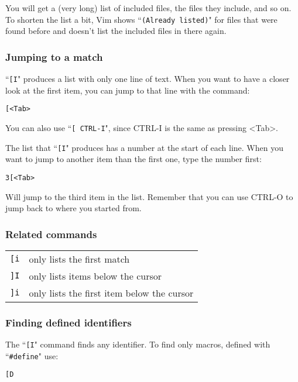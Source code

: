 You will get a (very long) list of included files, the files they include, and so on.
To shorten the list a bit, Vim shows ``\texttt{(Already listed)}" for files that were found before and doesn't list the included files in there again.

\subsubsection{Jumping to a match}
``\texttt{[I}" produces a list with only one line of text.
When you want to have a closer look at the first item, you can jump to that line with the command:

\begin{Verbatim}[samepage=true]
 [<Tab>
\end{Verbatim}

You can also use ``\texttt{[ CTRL-I}", since CTRL-I is the same as pressing <Tab>.

The list that ``\texttt{[I}" produces has a number at the start of each line.
When you want to jump to another item than the first one, type the number first:

\begin{Verbatim}[samepage=true]
 3[<Tab>
\end{Verbatim}

Will jump to the third item in the list.
Remember that you can use CTRL-O to jump back to where you started from.
\subsubsection{Related commands}

\begin{center} \begin{tabular}{c l}
\texttt{[i} & only lists the first match \\
\texttt{]I} & only lists items below the cursor \\
\texttt{]i} & only lists the first item below the cursor \\
\end{tabular} \end{center}

\subsubsection{Finding defined identifiers}
The ``\texttt{[I}" command finds any identifier.
To find only macros, defined with ``\texttt{\#define}" use:

\begin{Verbatim}[samepage=true]
 [D
\end{Verbatim}

